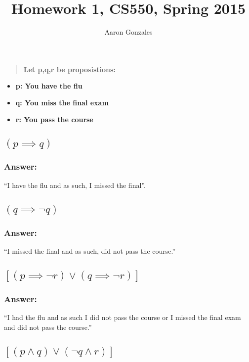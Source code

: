 \documentclass[titlepage]{article}\usepackage[]{graphicx}\usepackage[]{color}
\begin{document}
\title{Homework 1, CS550, Spring 2015}
\author{Aaron Gonzales}
\maketitle


\section{}
\begin{quote}
  \textbf{Let p,q,r be proposistions:}
\end{quote}

\begin{itemize}
  \item \textbf{p: You have the flu}
  \item \textbf{q: You miss the final exam}
  \item \textbf{r: You pass the course}
\end{itemize}

\subsection{ $(p \implies q)$ }
\subsubsection{Answer:}
``I have the flu and as such, I missed the final''.

\subsection{ $(q \implies \lnot q)$ }
\subsubsection{Answer:}
``I missed the final and as such, did not pass the course.''

\subsection{ $[(p \implies \lnot r) \lor (q \implies \lnot r)]$ }
\subsubsection{Answer:}
``I had the flu and as such I did not pass the course or I missed the final exam
and did not pass the course.''

\subsection{ $[(p \land q) \lor ( \lnot q \land r)]$ }
\end{document}
